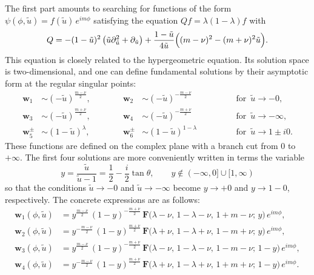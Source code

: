 \documentclass[12pt]{article}
\newcommand{\hgfs}{\mathbf{F}}
\newcommand{\tu}{\tilde{u}}
\newcommand{\ww}{\mathbf{w}}
\begin{document}
The first part amounts to searching for functions of the form $\psi(\phi,\tu)=f(\tu)\,e^{im\phi}$ satisfying the equation $Qf=\lambda(1-\lambda)f$ with
\begin{equation} \label{tgQ}
Q=-(1-\tu)^2\,\bigl(\tu\partial_{\tu}^2+\partial_{\tu}\bigr)
+\frac{1-\tu}{4\tu}\Bigl((m-\nu)^2-(m+\nu)^{2}\tu\Bigr).
\end{equation}
This equation is closely related to the hypergeometric equation. Its solution space is two-dimensional, and one can define fundamental solutions by their asymptotic form at the regular singular points:
\begin{equation}
\begin{alignedat}{3}
\ww_1&\sim (-\tu)^{\frac{m-\nu}{2}},\qquad\quad&
\ww_2&\sim (-\tu)^{-\frac{m-\nu}{2}}\qquad\quad&
&\text{for }\, \tu\to-0, \\[3pt]
\ww_3&\sim (-\tu)^{\frac{m+\nu}{2}},\qquad\quad&
\ww_4&\sim (-\tu)^{-\frac{m+\nu}{2}}\qquad\quad&
&\text{for }\, \tu\to-\infty, \\[3pt]
\ww_5^{\pm}&\sim (1-\tu)^{\lambda},\qquad\quad&
\ww_6^{\pm}&\sim (1-\tu)^{1-\lambda}\qquad\quad&
&\text{for }\, \tu\to 1\pm i0.
\end{alignedat}
\end{equation}
These functions are defined on the complex plane with a branch cut from $0$ to $+\infty$. The first four solutions are more conveniently written in terms the variable
\begin{equation}
y=\frac{\tu}{\tu-1}=\frac{1}{2}-\frac{i}{2}\tan\theta,\qquad
y\notin(-\infty,0]\cup[1,\infty)
\end{equation}
so that the conditions $\tu\to-0$ and $\tu\to-\infty$ become $y\to+0$ and $y\to1-0$, respectively. The concrete expressions are as follows:
\begin{equation}\label{ww1234}
\begin{aligned}
\ww_1(\phi,\tu)&=y^{\frac{m-\nu}{2}}\,(1-y)^{-\frac{m+\nu}{2}}\,
\hgfs\bigl(\lambda-\nu,\,1-\lambda-\nu,\,1+m-\nu;\,y\bigl)\, e^{im\phi},\\[3pt]
\ww_2(\phi,\tu)&=y^{-\frac{m-\nu}{2}}\,(1-y)^{\frac{m+\nu}{2}}\,
\hgfs\bigl(\lambda+\nu,\,1-\lambda+\nu,\,1-m+\nu;\,y\bigl)\, e^{im\phi},\\[3pt]
\ww_3(\phi,\tu)&=y^{\frac{m-\nu}{2}}\,(1-y)^{-\frac{m+\nu}{2}}\,
\hgfs\bigl(\lambda-\nu,\,1-\lambda-\nu,\,1-m-\nu;\,1-y\bigl)\, e^{im\phi},\\[3pt]
\ww_4(\phi,\tu)&=y^{-\frac{m-\nu}{2}}\,(1-y)^{\frac{m+\nu}{2}}\,
\hgfs\bigl(\lambda+\nu,\,1-\lambda+\nu,\,1+m+\nu;\,1-y\bigl)\, e^{im\phi}.
\end{aligned}
\end{equation}
\end{document}
